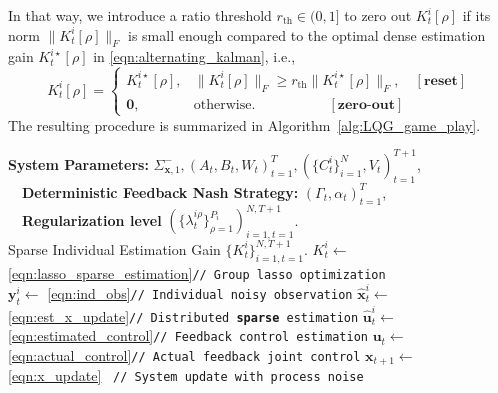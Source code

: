\documentclass[letterpaper, 10 pt, conference]{ieeeconf}  %
\begin{document}
In that way, we introduce a ratio threshold $r_{\text{th}}\in(0,1]$ to zero out $K_t^i[\rho]$ if its norm $\|K_t^i[\rho]\|_F$ is  small enough compared to the optimal dense estimation gain $K_t^{i\star}[\rho]$ in \eqref{eqn:alternating_kalman}, i.e.,
\begin{equation}
K_t^i[\rho] =
\begin{cases}
K_t^{i\star}[\rho], & \|K_t^i[\rho]\|_F\geq r_{\text{th}}\|K_t^{i\star}[\rho]\|_F,\quad [\textbf{reset}]\\
\mathbf{0}, & \text{otherwise}.\qquad\qquad\quad\  [\textbf{zero-out}]
\end{cases}
\label{eqn:reset_rule}
\end{equation}
The resulting procedure is summarized in Algorithm~\ref{alg:LQG_game_play}. 
\begin{algorithm}[!h]
    \small
    \caption{LQG Game with Sparse Distributed Estimation}
    \begin{algorithmic}[1]
        \renewcommand{\algorithmicrequire}{\textbf{Input:}}
        \renewcommand{\algorithmicensure}{\textbf{Output:}}
        \REQUIRE 
        \textbf{System Parameters:} ${\Sigma_{\textbf{x},1}^-, (A_t,B_t,W_t)_{t=1}^T, (\{C_t^i\}_{i=1}^N,V_t)_{t=1}^{T+1}}$,\\
        \ \ \quad \textbf{Deterministic Feedback Nash Strategy:} $(\Gamma_t,\alpha_t)_{t=1}^{T}$,\\
        \ \  \quad \textbf{Regularization level} $(\{\lambda_t^{i\rho}\}_{\rho=1}^{P_i})_{i=1,t=1}^{N,T+1}$.\\
        \ENSURE Sparse Individual Estimation Gain $\{K_t^i\}_{i=1,t=1}^{N,T+1}$.
            \STATE $K_t^i\leftarrow$ \eqref{eqn:lasso_sparse_estimation}\quad \texttt{// Group lasso optimization} \\
            \STATE $\textbf{y}_t^i\leftarrow$ \eqref{eqn:ind_obs}\quad \texttt{// Individual noisy observation}
            \STATE $\hat{\textbf{x}}_t^i\leftarrow$ \eqref{eqn:est_x_update}\quad \texttt{// Distributed \textbf{sparse} estimation}
            \STATE $\hat{\textbf{u}}_t^i\leftarrow$ \eqref{eqn:estimated_control}\quad \texttt{// Feedback control estimation}
        \ENDFOR
        \STATE $\textbf{u}_t\leftarrow$ \eqref{eqn:actual_control}\quad \texttt{// Actual feedback joint control}
        \STATE $\textbf{x}_{t+1}\leftarrow$ \eqref{eqn:x_update}~ \texttt{// System update with process noise}
        \ENDFOR
    \end{algorithmic}
    \label{alg:LQG_game_play}
\end{algorithm}
  
\end{document}
